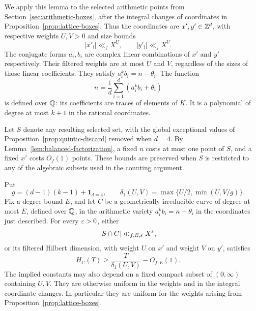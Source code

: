 We apply this lemma to the selected arithmetic points from
Section~\ref{sec:arithmetic-boxes}, after the integral changes of
coordinates in Proposition~\ref{prop:lattice-boxes}.  Thus the
coordinates are $x',y'\in\mathbb Z^d$, with respective weights $U,V>0$ and
size bounds
\[
 |x'_i|\ll_f X^U,\qquad |y'_i|\ll_f X^V.
\]
The conjugate forms $a_i,b_i$ are complex linear combinations of $x'$
and $y'$ respectively.  Their filtered weights are at most $U$ and
$V$, regardless of the sizes of those linear coefficients.  They
satisfy $a_i^k b_i=n-\theta_i$.  The function
\begin{equation}\label{eq:curve-input-function}
 n=\frac1d\sum_{i=1}^d(a_i^k b_i+\theta_i)
\end{equation}
is defined over $\mathbb Q$: its coefficients are traces of elements of $K$.
It is a polynomial of degree at most $k+1$ in the rational coordinates.

Let $S$ denote any resulting selected set, with the global exceptional
values of Proposition~\ref{prop:quintic-discard} removed when $d=4$.
By Lemma~\ref{lem:balanced-factorization}, a fixed $n$ costs at most one
point of $S$, and a fixed $x'$ costs $O_f(1)$ points.  These bounds are
preserved when $S$ is restricted to any of the algebraic subsets used
in the counting argument.

\begin{proposition}\label{prop:curve-alternatives}
Put
\[
 g=(d-1)(k-1)+\mathbf 1_{d=4},\qquad
 \delta_1(U,V)=\max\{U/2,\min(U,V/g)\}.
\]
Fix a degree bound $E$, and let $C$ be a geometrically irreducible
curve of degree at most $E$, defined over $\mathbb Q$, in the arithmetic
variety $a_i^k b_i=n-\theta_i$ in the coordinates just described.
For every $\varepsilon>0$, either
\[
 |S\cap C|\ll_{f,E,\varepsilon}X^\varepsilon,
\]
or its filtered Hilbert dimension, with weight $U$ on $x'$ and weight
$V$ on $y'$, satisfies
\begin{equation}\label{eq:curve-hilbert-bound}
 H_C(T)\ge \frac{T}{\delta_1(U,V)}-O_{f,E}(1).
\end{equation}
The implied constants may also depend on a fixed compact subset of
$(0,\infty)$ containing $U,V$.  They are otherwise uniform in the
weights and in the integral coordinate changes.  In particular they
are uniform for the weights arising from
Proposition~\ref{prop:lattice-boxes}.
\end{proposition}

